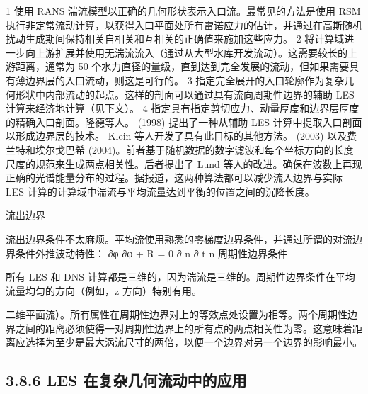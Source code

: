 \documentclass[11pt,a4paper,openany,fontset=none]{ctexbook}
\begin{document}
1 使用 RANS 湍流模型以正确的几何形状表示入口流。最常见的方法是使用 RSM 执行非定常流动计算，以获得入口平面处所有雷诺应力的估计，并通过在高斯随机扰动生成期间保持相关自相关和互相关的正确值来施加这些应力。 2 将计算域进一步向上游扩展并使用无湍流流入（通过从大型水库开发流动）。这需要较长的上游距离，通常为 50 个水力直径的量级，直到达到完全发展的流动，但如果需要具有薄边界层的入口流动，则这是可行的。 3 指定完全展开的入口轮廓作为复杂几何形状中内部流动的起点。这样的剖面可以通过具有流向周期性边界的辅助 LES 计算来经济地计算（见下文）。 4 指定具有指定剪切应力、动量厚度和边界层厚度的精确入口剖面。隆德等人。 (1998) 提出了一种从辅助 LES 计算中提取入口剖面以形成边界层的技术。 Klein 等人开发了具有此目标的其他方法。 (2003) 以及费兰特和埃尔戈巴希 (2004)。前者基于随机数据的数字滤波和每个坐标方向的长度尺度的规范来生成两点相关性。后者提出了 Lund 等人的改进。确保在波数上再现正确的光谱能量分布的过程。据报道，这两种算法都可以减少流入边界与实际 LES 计算的计算域中湍流与平均流量达到平衡的位置之间的沉降长度。

流出边界

流出边界条件不太麻烦。平均流使用熟悉的零梯度边界条件，并通过所谓的对流边界条件外推波动特性： ∂φ ∂φ + R = 0 ∂ n ∂ t n
周期性边界条件

所有 LES 和 DNS 计算都是三维的，因为湍流是三维的。周期性边界条件在平均流量均匀的方向（例如，z 方向）特别有用。

二维平面流）。所有属性在周期性边界对上的等效点处设置为相等。两个周期性边界之间的距离必须使得一对周期性边界上的所有点的两点相关性为零。这意味着距离应选择为至少是最大涡流尺寸的两倍，以便一个边界对另一个边界的影响最小。

\subsection*{3.8.6 LES 在复杂几何流动中的应用}
\end{document}
